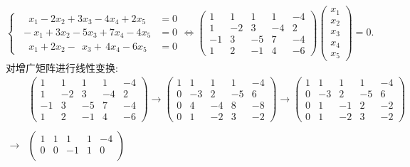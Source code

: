 \documentclass{article}
\begin{document}
\begin{enumerate}
\[\begin{cases}
            \quad x_1 - 2x_2 + 3x_3 -4x_4 +2x_5 &=0\\
            \;-x_1 + 3x_2 - 5x_3 + 7x_4 - 4x_5 &=0\\
            \quad x_1 + 2x_2 -\,\; x_3 +\, 4x_4 - 6x_5 &=0
        \end{cases}
        \Leftrightarrow
        \begin{pmatrix}
            1 & 1 & 1 & 1 & -4\\
            1 &-2 & 3 &-4 & 2\\
            -1& 3 &-5 & 7 & -4\\
            1 & 2 &-1 & 4 & -6
        \end{pmatrix}
        \begin{pmatrix}
            x_1\\
            x_2\\
            x_3\\
            x_4\\
            x_5
        \end{pmatrix}
        =0.
    \]
    对增广矩阵进行线性变换:
    \begin{align*}
        &\begin{pmatrix}
            1 & 1 & 1 & 1 & -4\\
            1 &-2 & 3 &-4 & 2\\
            -1& 3 &-5 & 7 & -4\\
            1 & 2 &-1 & 4 & -6
        \end{pmatrix}
        \to
        \begin{pmatrix}
            1 & 1 & 1 & 1 & -4\\
            0 &-3 & 2 &-5 & 6\\
            0 & 4 &-4 & 8 & -8\\
            0 & 1 &-2 & 3 & -2
        \end{pmatrix}
        \to
        \begin{pmatrix}
            1 & 1 & 1 & 1 & -4\\
            0 &-3 & 2 &-5 & 6\\
            0 & 1 &-1 & 2 & -2\\
            0 & 1 &-2 & 3 & -2
        \end{pmatrix}\\
        &\\
        \to &
        \begin{pmatrix}
            1 & 1 & 1 & 1 & -4\\
            0 & 0 &-1 & 1 & 0\\

\end{pmatrix}
\end{align*}
\end{enumerate}
\end{document}
